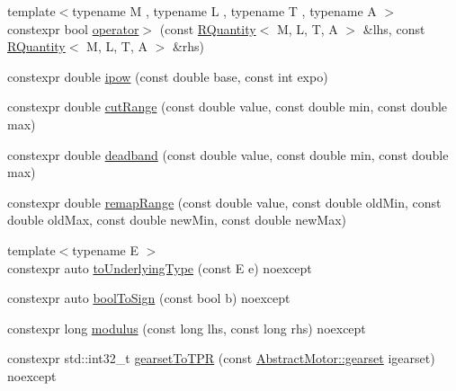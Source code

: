 \begin{DoxyCompactItemize}
\item 
{\footnotesize template$<$typename M , typename L , typename T , typename A $>$ }\\constexpr bool \mbox{\hyperlink{namespaceokapi_a6fa2a8add20e9524b5f46e98645c98f4}{operator$>$}} (const \mbox{\hyperlink{classokapi_1_1RQuantity}{R\+Quantity}}$<$ M, L, T, A $>$ \&lhs, const \mbox{\hyperlink{classokapi_1_1RQuantity}{R\+Quantity}}$<$ M, L, T, A $>$ \&rhs)
\item 
constexpr double \mbox{\hyperlink{namespaceokapi_aba6bd8fdde45445ead2bd8c3bf887fb4}{ipow}} (const double base, const int expo)
\item 
constexpr double \mbox{\hyperlink{namespaceokapi_a9addecfa5e4788ced786601de724be03}{cut\+Range}} (const double value, const double min, const double max)
\item 
constexpr double \mbox{\hyperlink{namespaceokapi_a3e4d3d6ba218365ec624a70840134039}{deadband}} (const double value, const double min, const double max)
\item 
constexpr double \mbox{\hyperlink{namespaceokapi_aa3f2ac5be19e6749d986489c69968605}{remap\+Range}} (const double value, const double old\+Min, const double old\+Max, const double new\+Min, const double new\+Max)
\item 
{\footnotesize template$<$typename E $>$ }\\constexpr auto \mbox{\hyperlink{namespaceokapi_a458b2538f443eedc4e601b2f8a9acf03}{to\+Underlying\+Type}} (const E e) noexcept
\item 
constexpr auto \mbox{\hyperlink{namespaceokapi_a8b21920388594f5d7da116069741deb4}{bool\+To\+Sign}} (const bool b) noexcept
\item 
constexpr long \mbox{\hyperlink{namespaceokapi_a32aac326b5e0f0ba82bb5dea50852504}{modulus}} (const long lhs, const long rhs) noexcept
\item 
constexpr std\+::int32\+\_\+t \mbox{\hyperlink{namespaceokapi_a771e911293fb57115a4085904bd83663}{gearset\+To\+T\+PR}} (const \mbox{\hyperlink{classokapi_1_1AbstractMotor_a88aaa6ea2fa10f5520a537bbf26774d5}{Abstract\+Motor\+::gearset}} igearset) noexcept
\end{DoxyCompactItemize}

